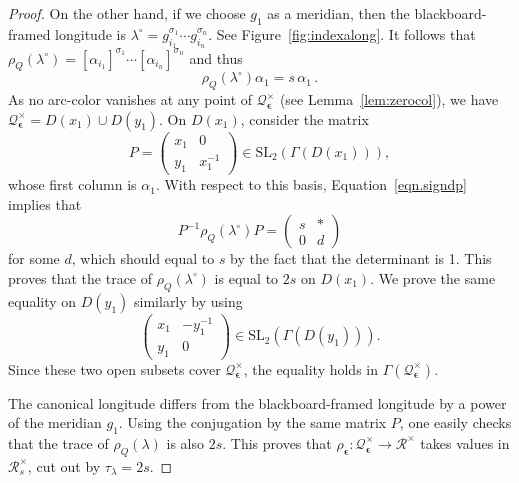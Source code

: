 \documentclass[12pt,reqno]{amsart}
\newcommand{\calQ}{\mathcal{Q}}
\newcommand{\calR}{\mathcal{R}}
\newcommand{\SL}{\mathrm{SL}}
\theoremstyle{definition}
\begin{document}
\begin{proof}
		On the other hand, if we choose $g_1$ as a meridian, then the blackboard-framed longitude is
		$\lambda^\circ = g_{i_1}^{\sigma_1}\cdots g_{i_n}^{\sigma_n}$. See Figure~\ref{fig:indexalong}. It follows that  $\rho_Q(\lambda^\circ) = [\alpha_{i_1}]^{\sigma_1}\cdots [\alpha_{i_n}]^{\sigma_n}$ and thus
		\begin{equation} \label{eqn.signdp}
			\rho_Q(\lambda^\circ)\alpha_1= s\, \alpha_1 \,.
		\end{equation}
		As no arc-color vanishes at any point of $\calQ_{\boldsymbol{\epsilon}}^\times$ (see Lemma~\ref{lem:zerocol}), we have $\calQ_{\boldsymbol{\epsilon}}^\times=D(x_1)\cup D(y_1)$. On $D(x_1)$, consider the matrix
		\[
		P=
		\begin{pmatrix}
			x_1&0\\
			y_1&x_1^{-1}
		\end{pmatrix}
		\in\SL_2(\Gamma(D(x_1))),
		\]
		whose first column is $\alpha_1$. With respect to this basis, Equation~\eqref{eqn.signdp} implies that
		\[
		P^{-1} \rho_Q(\lambda^\circ) P =
		\begin{pmatrix}
			s&*\\
			0&d
		\end{pmatrix}
		\]
		for some $d$, which should equal to $s$ by the fact that the determinant is 1. This proves that the trace of  $\rho_Q(\lambda^\circ)$ is equal to $2s$ on $D(x_1)$. We prove the same equality on $D(y_1)$ similarly by using
		\[
		\begin{pmatrix}
			x_1&-y_1^{-1}\\
			y_1&0
		\end{pmatrix}
		\in\SL_2 (\Gamma(D(y_1))).
		\]
		Since these two open subsets cover $\calQ_{\boldsymbol{\epsilon}}^\times$, the equality holds in $\Gamma(\calQ_{\boldsymbol{\epsilon}}^\times)$.
		
		The canonical longitude differs from the blackboard-framed longitude by a power of the meridian $g_1$. Using the conjugation by the same matrix $P$, one easily checks that the trace of $\rho_Q(\lambda)$ is also $2s$.
		This proves that $\rho_{\boldsymbol{\epsilon}} : \calQ_{\boldsymbol{\epsilon}}^\times \rightarrow \calR^\times$
		takes values in $\calR^\times_s$, cut out by $\tau_\lambda =2s$.
	\end{proof}
	
\end{document}
